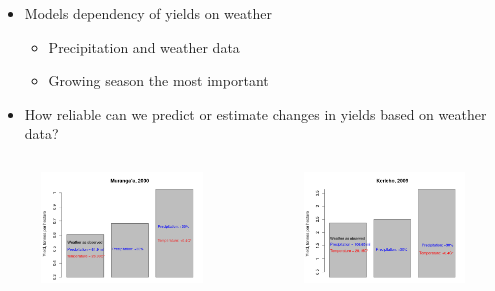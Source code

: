 \documentclass{beamer}              %
\begin{document}
\begin{frame}


 \begin{itemize}
     \item Models dependency of yields on weather
     
 \begin{itemize}
     \item Precipitation and weather data
        \item Growing season the most important
     
     
 \end{itemize}
          \item How reliable can we predict or estimate changes in yields based on weather data?
 \end{itemize}
   
  
      \begin{columns}
  \begin{figure}
   \includegraphics[width = 1\textwidth]{Muranga.png}
     \end{figure}
           \begin{figure}
   \includegraphics[width = 1\textwidth]{Kericho.png}

     \end{figure}
      \end{columns}
 



\end{frame}
\end{document}
